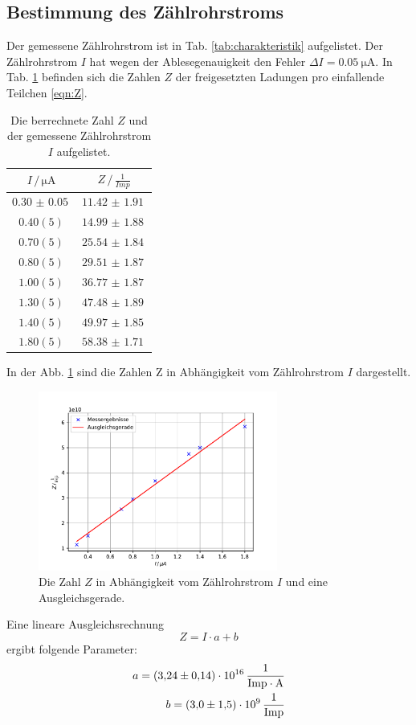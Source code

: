 \subsection{Bestimmung des Zählrohrstroms}
Der gemessene Zählrohrstrom ist in Tab. \ref{tab:charakteristik} aufgelistet.
Der Zählrohrstrom $I$ hat wegen der Ablesegenauigkeit den Fehler $\Delta I = \SI{0.05}{\micro \ampere}$.
In Tab. \ref{tab:zahl_z} befinden sich die Zahlen $Z$ der freigesetzten Ladungen pro einfallende Teilchen \eqref{eqn:Z}.
\begin{table}
    \centering
    \begin{tabular}{cc}
        \toprule
        $I \,/\, \si{\micro \ampere}$ & $Z \,/\, \frac{1}{Imp}$ \\
        \midrule
        $\SI{0.30(5)}{}$ & $\SI{11.42(191)}{}$ \\
        $\SI{0.40}(5){}$ & $\SI{14.99(188)}{}$ \\
        $\SI{0.70}(5){}$ & $\SI{25.54(184)}{}$ \\
        $\SI{0.80}(5){}$ & $\SI{29.51(187)}{}$ \\
        $\SI{1.00}(5){}$ & $\SI{36.77(187)}{}$ \\
        $\SI{1.30}(5){}$ & $\SI{47.48(189)}{}$ \\
        $\SI{1.40}(5){}$ & $\SI{49.97(185)}{}$ \\
        $\SI{1.80}(5){}$ & $\SI{58.38(171)}{}$ \\
        \bottomrule
    \end{tabular}
    \caption{Die berrechnete Zahl $Z$ und der gemessene Zählrohrstrom $I$ aufgelistet.}
    \label{tab:zahl_z}
\end{table}
In der Abb. \ref{fig:zahl_z} sind die Zahlen Z in Abhängigkeit vom Zählrohrstrom $I$ dargestellt.
\begin{figure}
    \centering
    \includegraphics[width=0.7\textwidth]{content/data/zaehlrohrstrom.pdf}
    \caption{Die Zahl $Z$ in Abhängigkeit vom Zählrohrstrom $I$ und eine Ausgleichsgerade. \cite{numpy} \cite{matplotlib} \cite{scipy}}
    \label{fig:zahl_z}
\end{figure}
\FloatBarrier
Eine lineare Ausgleichsrechnung
\begin{equation*}
    Z = I \cdot a + b
\end{equation*}
ergibt folgende Parameter:
\begin{align*}
    a = \SI{3.24(14)e16}{\frac{1}{Imp \cdot \ampere}} \\
    b = \SI{3.0(15)e9}{\frac{1}{Imp}}
\end{align*}